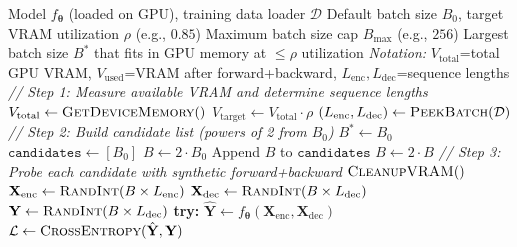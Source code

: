 \documentclass[11pt]{article}
\begin{document}
\begin{algorithm}[t]
\caption{Auto Batch Size (VRAM-Maximizing Binary Search)}\label{alg:autobatch}
\begin{algorithmic}[1]
\Require Model $f_{\boldsymbol{\theta}}$ (loaded on GPU), training data loader $\mathcal{D}$
\Require Default batch size $B_0$, target VRAM utilization $\rho$ (e.g., $0.85$)
\Require Maximum batch size cap $B_{\max}$ (e.g., $256$)
\Ensure Largest batch size $B^*$ that fits in GPU memory at $\leq \rho$ utilization
\Statex \textit{Notation:} $V_{\text{total}}$=total GPU VRAM,
    $V_{\text{used}}$=VRAM after forward+backward,
    $L_{\text{enc}}, L_{\text{dec}}$=sequence lengths
\Statex
\Statex \hspace{\algorithmicindent}\textit{// Step 1: Measure available VRAM and determine sequence lengths}
\State $V_{\text{total}} \gets \textsc{GetDeviceMemory}()$
\State $V_{\text{target}} \gets V_{\text{total}} \cdot \rho$
\State $(L_{\text{enc}}, L_{\text{dec}}) \gets \textsc{PeekBatch}(\mathcal{D})$
\Statex
\Statex \hspace{\algorithmicindent}\textit{// Step 2: Build candidate list (powers of 2 from $B_0$)}
\State $B^* \gets B_0$
\State $\texttt{candidates} \gets [B_0]$
\State $B \gets 2 \cdot B_0$
    \State Append $B$ to $\texttt{candidates}$
    \State $B \gets 2 \cdot B$
\EndWhile
\Statex
\Statex \hspace{\algorithmicindent}\textit{// Step 3: Probe each candidate with synthetic forward+backward}
    \State $\textsc{CleanupVRAM}()$
    \State $\mathbf{X}_{\text{enc}} \gets \textsc{RandInt}(B \times L_{\text{enc}})$
    \State $\mathbf{X}_{\text{dec}} \gets \textsc{RandInt}(B \times L_{\text{dec}})$
    \State $\mathbf{Y} \gets \textsc{RandInt}(B \times L_{\text{dec}})$
    \State \textbf{try:}
    \State \hspace{\algorithmicindent} $\hat{\mathbf{Y}} \gets f_{\boldsymbol{\theta}}(\mathbf{X}_{\text{enc}}, \mathbf{X}_{\text{dec}})$
    \State \hspace{\algorithmicindent} $\mathcal{L} \gets \textsc{CrossEntropy}(\hat{\mathbf{Y}}, \mathbf{Y})$

\end{algorithmic}
\end{algorithm}
\end{document}
